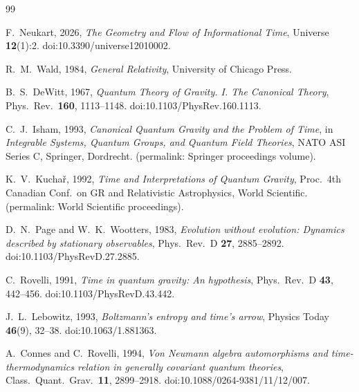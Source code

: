 \documentclass[11pt]{article}
\begin{document}
    \begin{thebibliography}{99}

        F.~Neukart, 2026,
        \textit{The Geometry and Flow of Informational Time},
        Universe \textbf{12}(1):2.
        doi:10.3390/universe12010002.

        R.~M.~Wald, 1984,
        \textit{General Relativity},
        University of Chicago Press.

        B.~S.~DeWitt, 1967,
        \textit{Quantum Theory of Gravity. I. The Canonical Theory},
        Phys.\ Rev.\ \textbf{160}, 1113--1148.
        doi:10.1103/PhysRev.160.1113.

        C.~J.~Isham, 1993,
        \textit{Canonical Quantum Gravity and the Problem of Time},
        in \textit{Integrable Systems, Quantum Groups, and Quantum Field Theories},
        NATO ASI Series C, Springer, Dordrecht.
        (permalink: Springer proceedings volume).

        K.~V.~Kucha\v{r}, 1992,
        \textit{Time and Interpretations of Quantum Gravity},
        Proc.\ 4th Canadian Conf.\ on GR and Relativistic Astrophysics,
        World Scientific.
        (permalink: World Scientific proceedings).

        D.~N.~Page and W.~K.~Wootters, 1983,
        \textit{Evolution without evolution: Dynamics described by stationary observables},
        Phys.\ Rev.\ D \textbf{27}, 2885--2892.
        doi:10.1103/PhysRevD.27.2885.

        C.~Rovelli, 1991,
        \textit{Time in quantum gravity: An hypothesis},
        Phys.\ Rev.\ D \textbf{43}, 442--456.
        doi:10.1103/PhysRevD.43.442.

        J.~L.~Lebowitz, 1993,
        \textit{Boltzmann's entropy and time's arrow},
        Physics Today \textbf{46}(9), 32--38.
        doi:10.1063/1.881363.

        A.~Connes and C.~Rovelli, 1994,
        \textit{Von Neumann algebra automorphisms and time-thermodynamics relation in generally covariant quantum theories},
        Class.\ Quant.\ Grav.\ \textbf{11}, 2899--2918.
        doi:10.1088/0264-9381/11/12/007.


\end{thebibliography}
\end{document}
